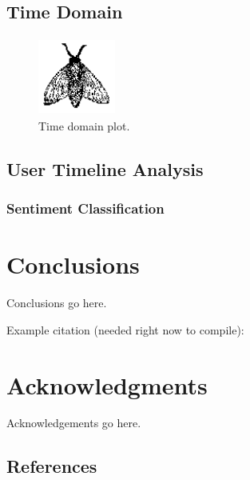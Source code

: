 \documentclass{sig-alternate-05-2015}
\begin{document}
\subsection{Time Domain}


\begin{figure}
\centering
\includegraphics[height=1in, width=1in]{fly}
\caption{Time domain plot.}
\end{figure}


\subsection{User Timeline Analysis}


\subsubsection{Sentiment Classification}



\section{Conclusions}

Conclusions go here.

Example citation (needed right now to compile):\cite{Lamport:LaTeX}


\section{Acknowledgments}

Acknowledgements go here.

%

%
%


\subsection{References}
\end{document}
